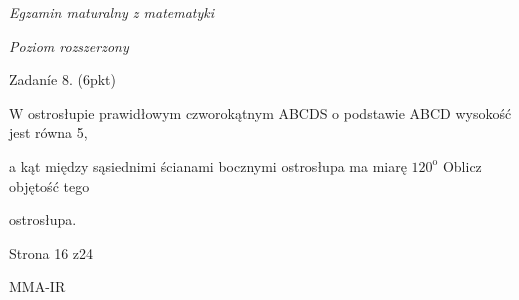 \documentclass[a4paper,12pt]{article}
\begin{document}
{\it Egzamin maturalny z matematyki}

{\it Poziom rozszerzony}

Zadaníe 8. (6pkt)

$\mathrm{W}$ ostrosłupie prawidłowym czworokątnym ABCDS o podstawie ABCD wysokość jest równa 5,

a kąt między sąsiednimi ścianami bocznymi ostrosłupa ma miarę $120^{\mathrm{o}}$ Oblicz objętość tego

ostrosłupa.

Strona 16 z24

MMA-IR
\end{document}
